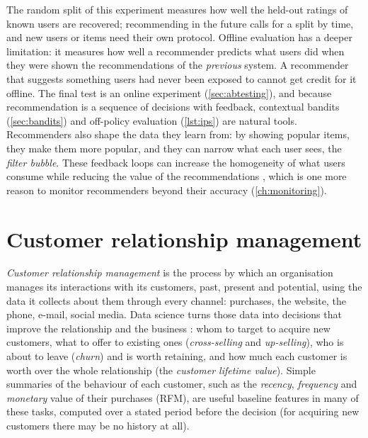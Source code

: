 The random split of this experiment measures how well the held-out ratings of known users are
recovered; recommending in the future calls for a split by time, and new users or items need their own protocol.
Offline evaluation has a deeper limitation: it measures how well a recommender predicts what users did when they were shown the
recommendations of the \emph{previous} system. A recommender that suggests something users had never been exposed to cannot get
credit for it offline. The final test is an online experiment (\cref{sec:abtesting}), and because recommendation is a sequence of
decisions with feedback, contextual bandits (\cref{sec:bandits}) and off-policy evaluation (\cref{lst:ips}) are natural tools.
Recommenders also shape the data they learn from: by showing popular items, they make them more popular, and they can narrow what
each user sees, the \emph{filter bubble}. These feedback loops can increase the homogeneity of what users consume while reducing
the value of the recommendations \citep{chaney2018algorithmic}, which is one more reason to monitor recommenders beyond their
accuracy (\cref{ch:monitoring}).

\section{Customer relationship management}\label{sec:crm}

\emph{Customer relationship management} is the process by which an organisation manages its interactions with its
customers, past, present and potential, using the data it collects about them through every channel: purchases, the
website, the phone, e-mail, social media. Data science turns those data into decisions that improve the relationship
and the business \citep{provost2013data}: whom to target to acquire new customers, what to offer to existing ones
(\emph{cross-selling} and \emph{up-selling}), who is about to leave (\emph{churn}) and is worth retaining, and how much
each customer is worth over the whole relationship (the \emph{customer lifetime value}). Simple summaries of the
behaviour of each customer, such as the \emph{recency}, \emph{frequency} and \emph{monetary} value of their purchases
(RFM), are useful baseline
features in many of these tasks, computed over a stated period before the decision (for acquiring new customers
there may be no history at all).

